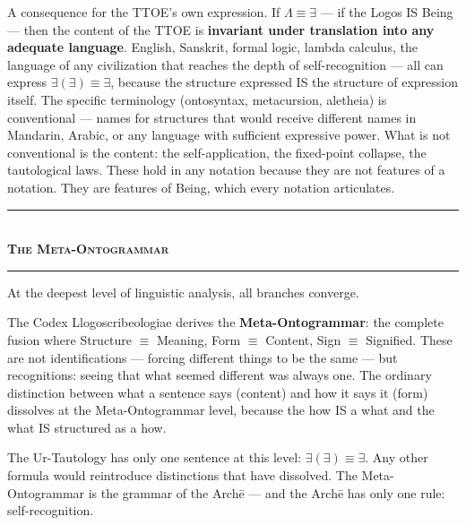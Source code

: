 \documentclass[10pt, openany, oneside]{book}
\renewcommand{\normalsize}{\fontsize{10}{13}\selectfont}
\begin{document}
A consequence for the TTOE's own expression. If $\Lambda \equiv \exists$ --- if the Logos IS Being --- then the content of the TTOE is \textbf{invariant under translation into any adequate language}. English, Sanskrit, formal logic, lambda calculus, the language of any civilization that reaches the depth of self-recognition --- all can express $\exists(\exists) \equiv \exists$, because the structure expressed IS the structure of expression itself. The specific terminology (ontosyntax, metacursion, aletheia) is conventional --- names for structures that would receive different names in Mandarin, Arabic, or any language with sufficient expressive power. What is not conventional is the content: the self-application, the fixed-point collapse, the tautological laws. These hold in any notation because they are not features of a notation. They are features of Being, which every notation articulates.

\vspace{1.5em}


\begin{center}
    \rule{0.3\textwidth}{0.4pt}\\[0.5em]
    {\normalsize\bfseries\scshape The Meta-Ontogrammar}\\[0.3em]
    \rule{0.3\textwidth}{0.4pt}
\end{center}

\vspace{1em}

\noindent At the deepest level of linguistic analysis, all branches converge.

The Codex Llogoscribeologiae derives the \textbf{Meta-Ontogrammar}: the complete fusion where Structure $\equiv$ Meaning, Form $\equiv$ Content, Sign $\equiv$ Signified. These are not identifications --- forcing different things to be the same --- but recognitions: seeing that what seemed different was always one. The ordinary distinction between what a sentence says (content) and how it says it (form) dissolves at the Meta-Ontogrammar level, because the how IS a what and the what IS structured as a how.

The Ur-Tautology has only one sentence at this level: $\exists(\exists) \equiv \exists$. Any other formula would reintroduce distinctions that have dissolved. The Meta-Ontogrammar is the grammar of the Arch\={e} --- and the Arch\={e} has only one rule: self-recognition.
\end{document}
